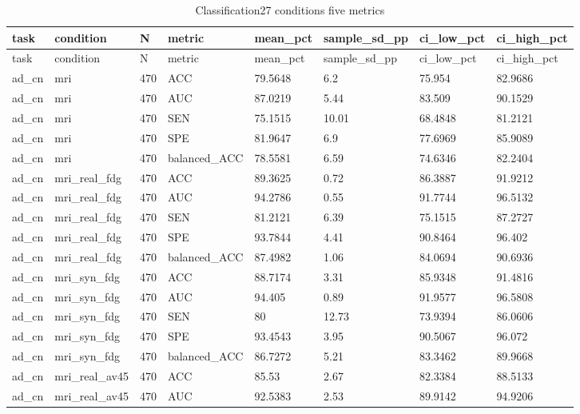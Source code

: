 \begin{landscape}
\begingroup
\footnotesize
\setlength{\tabcolsep}{4pt}
\begin{longtable}{llllllll}
\caption{Classification27 conditions five metrics}\label{tab:s-n13}\\
\toprule
task & condition & N & metric & mean\_pct & sample\_sd\_pp & ci\_low\_pct & ci\_high\_pct \\
\midrule
\endfirsthead
\toprule
task & condition & N & metric & mean\_pct & sample\_sd\_pp & ci\_low\_pct & ci\_high\_pct \\
\midrule
\endhead
\bottomrule
\endfoot
ad\_cn & mri & 470 & ACC & 79.5648 & 6.2 & 75.954 & 82.9686 \\
ad\_cn & mri & 470 & AUC & 87.0219 & 5.44 & 83.509 & 90.1529 \\
ad\_cn & mri & 470 & SEN & 75.1515 & 10.01 & 68.4848 & 81.2121 \\
ad\_cn & mri & 470 & SPE & 81.9647 & 6.9 & 77.6969 & 85.9089 \\
ad\_cn & mri & 470 & balanced\_ACC & 78.5581 & 6.59 & 74.6346 & 82.2404 \\
ad\_cn & mri\_real\_fdg & 470 & ACC & 89.3625 & 0.72 & 86.3887 & 91.9212 \\
ad\_cn & mri\_real\_fdg & 470 & AUC & 94.2786 & 0.55 & 91.7744 & 96.5132 \\
ad\_cn & mri\_real\_fdg & 470 & SEN & 81.2121 & 6.39 & 75.1515 & 87.2727 \\
ad\_cn & mri\_real\_fdg & 470 & SPE & 93.7844 & 4.41 & 90.8464 & 96.402 \\
ad\_cn & mri\_real\_fdg & 470 & balanced\_ACC & 87.4982 & 1.06 & 84.0694 & 90.6936 \\
ad\_cn & mri\_syn\_fdg & 470 & ACC & 88.7174 & 3.31 & 85.9348 & 91.4816 \\
ad\_cn & mri\_syn\_fdg & 470 & AUC & 94.405 & 0.89 & 91.9577 & 96.5808 \\
ad\_cn & mri\_syn\_fdg & 470 & SEN & 80 & 12.73 & 73.9394 & 86.0606 \\
ad\_cn & mri\_syn\_fdg & 470 & SPE & 93.4543 & 3.95 & 90.5067 & 96.072 \\
ad\_cn & mri\_syn\_fdg & 470 & balanced\_ACC & 86.7272 & 5.21 & 83.3462 & 89.9668 \\
ad\_cn & mri\_real\_av45 & 470 & ACC & 85.53 & 2.67 & 82.3384 & 88.5133 \\
ad\_cn & mri\_real\_av45 & 470 & AUC & 92.5383 & 2.53 & 89.9142 & 94.9206 \\

\end{longtable}
\end{landscape}

